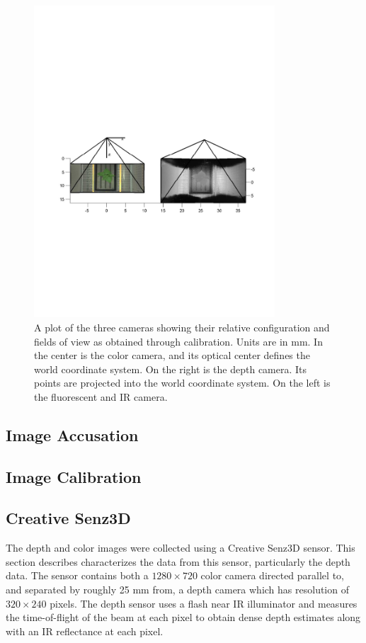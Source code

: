 \begin{figure}
  \includegraphics[width=9cm,trim=20 240 20 300,clip]{Figures/CameraConfiguration}
\caption{A plot of the three cameras showing their relative configuration and fields of view as obtained through calibration.  Units are in mm.  In the center is the color camera, and its optical center defines the world coordinate system.  On the right is the depth camera.  Its points are projected into the world coordinate system.  On the left is the fluorescent and IR camera.}
\label{fig:CameraConfiguration}
\end{figure}

\subsection{Image Accusation}

\subsection{Image Calibration}

\subsection{Creative Senz3D}

The depth and color images were collected using a Creative Senz3D sensor.
This section describes characterizes the data from this sensor, particularly the depth data.
The sensor contains both a $1280 \times 720$ color camera directed parallel to, and separated by roughly 25 mm from, a depth camera which has resolution of $320\times240$ pixels.
The depth sensor uses a flash near IR illuminator and measures the time-of-flight of the beam at each pixel to obtain dense depth estimates along with an IR reflectance at each pixel.

